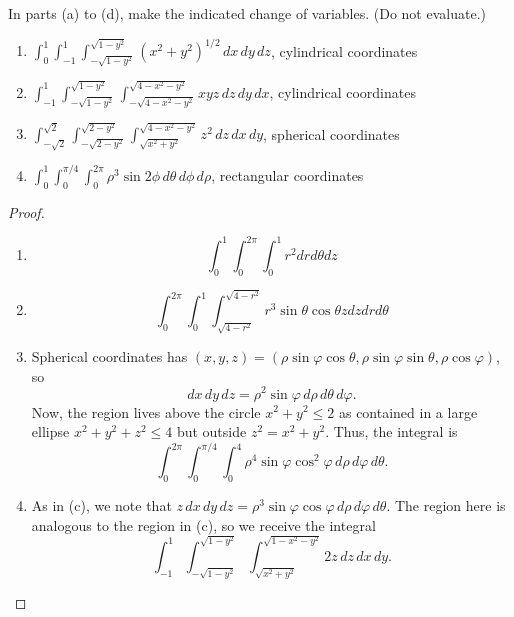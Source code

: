\documentclass[openany]{book}
\begin{document}
\begin{prob}[4]
    In parts (a) to (d), make the indicated change of variables. (Do not evaluate.)

    \begin{enumerate}
        \item[(a)] \(\displaystyle \int_{0}^{1} \int_{-1}^{1} \int_{-\sqrt{1-y^2}}^{\sqrt{1-y^2}} (x^2 + y^2)^{1/2} \, dx \, dy \, dz\), cylindrical coordinates
        \item[(b)] \(\displaystyle \int_{-1}^{1} \int_{-\sqrt{1-y^2}}^{\sqrt{1-y^2}} \int_{-\sqrt{4-x^2-y^2}}^{\sqrt{4-x^2-y^2}} xyz \, dz \, dy \, dx\), cylindrical coordinates
        \item[(c)] \(\displaystyle \int_{-\sqrt{2}}^{\sqrt{2}} \int_{-\sqrt{2-y^2}}^{\sqrt{2-y^2}} \int_{\sqrt{x^2+y^2}}^{\sqrt{4-x^2-y^2}} z^2 \, dz \, dx \, dy\), spherical coordinates
        \item[(d)] \(\displaystyle \int_{0}^{1} \int_{0}^{\pi/4} \int_{0}^{2\pi} \rho^3 \sin 2\phi \, d\theta \, d\phi \, d\rho\), rectangular coordinates
    \end{enumerate}
\end{prob}
\begin{proof}
    \begin{enumerate}
        \item[(a)] 
        \begin{equation*}
            \int_0^1\int_0^{2\pi}\int_{0}^1r^2drd\theta dz
        \end{equation*}
        \item[(b)]
        \begin{equation*}
            \int_0^{2\pi}\int_0^1\int_{\sqrt{4-r^2}}^{\sqrt{4-r^2}}r^3\sin\theta\cos\theta zdzdrd\theta
        \end{equation*}
        \item[(c)] Spherical coordinates has $(x,y,z)=(\rho\sin\varphi\cos\theta,\rho\sin\varphi\sin\theta,\rho\cos\varphi)$, so
        \[dx\,dy\,dz=\rho^2\sin\varphi\,d\rho\,d\theta\,d\varphi.\]
        Now, the region lives above the circle $x^2+y^2\le2$ as contained in a large ellipse $x^2+y^2+z^2\le4$ but outside $z^2=x^2+y^2$. Thus, the integral is
        \[\int_0^{2\pi}\int_0^{\pi/4}\int_0^4\rho^4\sin\varphi\cos^2\varphi\,d\rho\,d\varphi\,d\theta.\]
        \item[(d)] As in (c), we note that $z\,dx\,dy\,dz=\rho^3\sin\varphi\cos\varphi\,d\rho\,d\varphi\,d\theta$. The region here is analogous to the region in (c), so we receive the integral
        \[\int_{-1}^{1} \int_{-\sqrt{1-y^2}}^{\sqrt{1-y^2}} \int_{\sqrt{x^2+y^2}}^{\sqrt{1-x^2-y^2}} 2z \, dz \, dx \, dy.\]
    \end{enumerate}
\end{proof}
\end{document}
